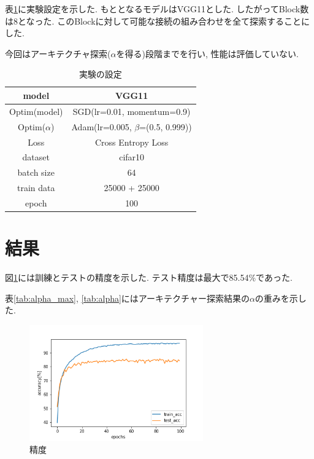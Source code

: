 \documentclass[twocolumn]{jarticle}     %
\begin{document}
表\ref{tab:setting}に実験設定を示した.
もととなるモデルはVGG11とした.
したがってBlock数は8となった.
このBlockに対して可能な接続の組み合わせを全て探索することにした.

今回はアーキテクチャ探索($\alpha$を得る)段階までを行い, 性能は評価していない.

\begin{table}[tb]
  \begin{center}
    \caption{実験の設定}
    \begin{tabular}{|c|c|} \hline
      model & VGG11 \\ \hline
      Optim(model) & SGD(lr=0.01, momentum=0.9) \\ \hline
      Optim($\alpha$) & Adam(lr=0.005, $\beta$=(0.5, 0.999)) \\ \hline
      Loss & Cross Entropy Loss \\ \hline
      dataset & cifar10 \\ \hline
      batch size & 64 \\ \hline
      train data & 25000 + 25000 \\ \hline
      epoch & 100 \\ \hline
    \end{tabular}
    \label{tab:setting}
  \end{center}
\end{table}

\section{結果}

図\ref{fig:acc}には訓練とテストの精度を示した.
テスト精度は最大で85.54\%であった.

表\ref{tab:alpha_max}, \ref{tab:alpha}にはアーキテクチャー探索結果の$\alpha$の重みを示した.

\begin{figure}[tb]
	\begin{center}
		\includegraphics[clip,width=7.5cm]{acc.png}
		\caption{精度}
		\label{fig:acc}
	\end{center}
\end{figure}
\end{document}
